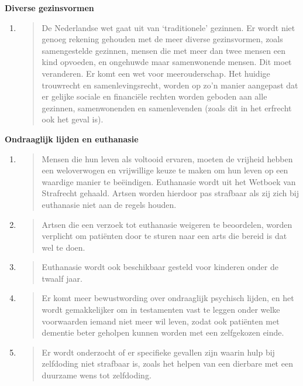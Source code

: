 \textbf{Diverse gezinsvormen}

\begin{enumerate}
\def\labelenumi{\arabic{enumi}.}
\item
  \begin{quote}
  De Nederlandse wet gaat uit van `traditionele' gezinnen. Er wordt niet
  genoeg rekening gehouden met de meer diverse gezinsvormen, zoals
  samengestelde gezinnen, mensen die met meer dan twee mensen een kind
  opvoeden, en ongehuwde maar samenwonende mensen. Dit moet veranderen.
  Er komt een wet voor meerouderschap. Het huidige trouwrecht en
  samenlevingsrecht, worden op zo'n manier aangepast dat er gelijke
  sociale en financiële rechten worden geboden aan alle gezinnen,
  samenwonenden en samenlevenden (zoals dit in het erfrecht ook het
  geval is).
  \end{quote}
\end{enumerate}

\textbf{Ondraaglijk lijden en euthanasie}

\begin{enumerate}
\def\labelenumi{\arabic{enumi}.}
\item
  \begin{quote}
  Mensen die hun leven als voltooid ervaren, moeten de vrijheid hebben
  een weloverwogen en vrijwillige keuze te maken om hun leven op een
  waardige manier te beëindigen. Euthanasie wordt uit het Wetboek van
  Strafrecht gehaald. Artsen worden hierdoor pas strafbaar als zij zich
  bij euthanasie niet aan de regels houden.
  \end{quote}
\item
  \begin{quote}
  Artsen die een verzoek tot euthanasie weigeren te beoordelen, worden
  verplicht om patiënten door te sturen naar een arts die bereid is dat
  wel te doen.
  \end{quote}
\item
  \begin{quote}
  Euthanasie wordt ook beschikbaar gesteld voor kinderen onder de twaalf
  jaar.
  \end{quote}
\item
  \begin{quote}
  Er komt meer bewustwording over ondraaglijk psychisch lijden, en het
  wordt gemakkelijker om in testamenten vast te leggen onder welke
  voorwaarden iemand niet meer wil leven, zodat ook patiënten met
  dementie beter geholpen kunnen worden met een zelfgekozen einde.
  \end{quote}
\item
  \begin{quote}
  Er wordt onderzocht of er specifieke gevallen zijn waarin hulp bij
  zelfdoding niet strafbaar is, zoals het helpen van een dierbare met
  een duurzame wens tot zelfdoding.
  \end{quote}
\end{enumerate}


